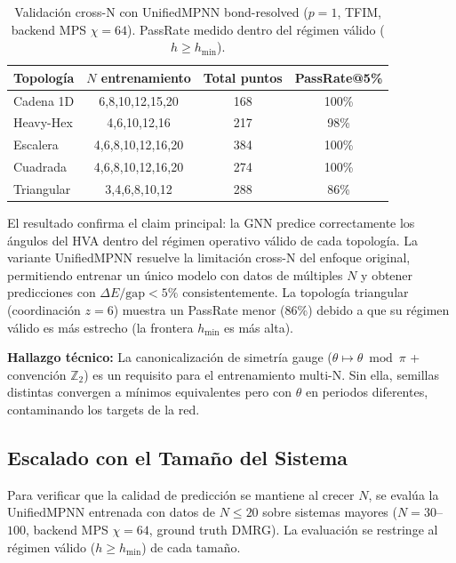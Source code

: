 \documentclass[11pt,a4paper,spanish]{book}
\begin{document}
\begin{table}[h]
\centering
\caption{Validación cross-N con UnifiedMPNN bond-resolved ($p = 1$, TFIM, backend MPS $\chi = 64$). PassRate medido dentro del régimen válido ($h \geq h_{\min}$).}
\label{tab:cross_n_transfer}
\begin{tabular}{lccc}
\toprule
\textbf{Topología} & \textbf{$N$ entrenamiento} & \textbf{Total puntos} & \textbf{PassRate@5\%} \\
\midrule
Cadena 1D & 6,8,10,12,15,20 & 168 & 100\% \\
Heavy-Hex & 4,6,10,12,16 & 217 & 98\% \\
Escalera & 4,6,8,10,12,16,20 & 384 & 100\% \\
Cuadrada & 4,6,8,10,12,16,20 & 274 & 100\% \\
Triangular & 3,4,6,8,10,12 & 288 & 86\% \\
\bottomrule
\end{tabular}
\end{table}

El resultado confirma el claim principal: la GNN predice correctamente los ángulos del HVA dentro del régimen operativo válido de cada topología. La variante UnifiedMPNN resuelve la limitación cross-N del enfoque original, permitiendo entrenar un único modelo con datos de múltiples $N$ y obtener predicciones con $\Delta E/\text{gap} < 5\%$ consistentemente. La topología triangular (coordinación $z = 6$) muestra un PassRate menor (86\%) debido a que su régimen válido es más estrecho (la frontera $h_{\min}$ es más alta).

\textbf{Hallazgo técnico:} La canonicalización de simetría gauge ($\theta \mapsto \theta \bmod \pi$ + convención $\mathbb{Z}_2$) es un requisito para el entrenamiento multi-N. Sin ella, semillas distintas convergen a mínimos equivalentes pero con $\theta$ en periodos diferentes, contaminando los targets de la red.

\subsection{Escalado con el Tamaño del Sistema}
\label{subsec:large_n_extrap}

Para verificar que la calidad de predicción se mantiene al crecer $N$, se evalúa la UnifiedMPNN entrenada con datos de $N \leq 20$ sobre sistemas mayores ($N = 30$--$100$, backend MPS $\chi = 64$, ground truth DMRG). La evaluación se restringe al régimen válido ($h \geq h_{\min}$) de cada tamaño.
\end{document}
